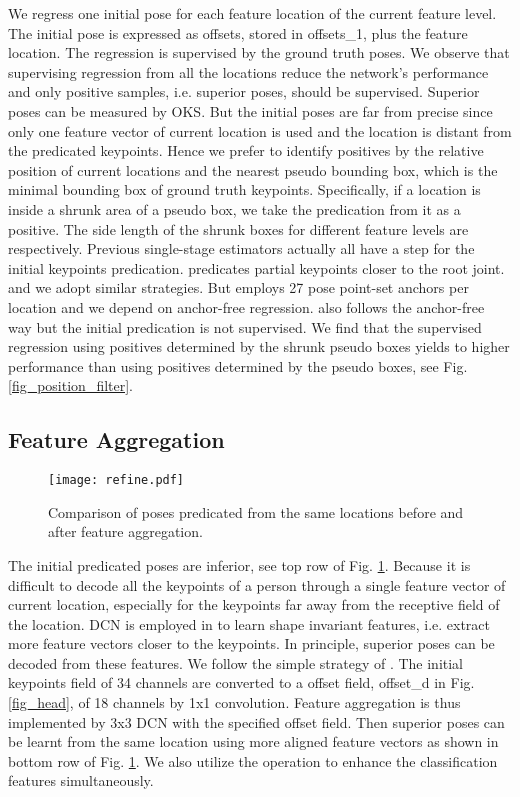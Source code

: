 \documentclass[11pt,twocolumn,journal]{IEEEtran}
\newcommand{\fig}{Fig. }
\begin{document}
We regress one initial pose for each feature location of the current feature level. The initial pose is expressed as  offsets, stored in offsets\_1, plus the feature location. 
The regression is supervised by the ground truth poses. We observe that supervising regression from all the locations reduce the network's performance and only positive samples, i.e. superior poses, should be supervised.  
Superior poses can be measured by OKS. But the initial poses are far from  precise since only one feature vector of current location is used and the location is distant from the predicated keypoints. Hence we prefer to 
identify positives by the relative position of current locations and the nearest pseudo bounding box, which is the minimal bounding box of ground truth keypoints. Specifically, if a location is inside a shrunk area of a pseudo box, we take the predication from it as a positive. The side length of the shrunk boxes for different feature levels are  respectively. 
Previous single-stage estimators \cite{spm19, directpose19, pointset20} actually all have a step for the initial keypoints predication. \cite{spm19} predicates partial keypoints closer to the root joint. \cite{directpose19, pointset20} and we adopt similar strategies. But \cite{pointset20} employs 27 pose point-set anchors per location and we depend on anchor-free regression. \cite{directpose19} also follows the anchor-free way but the initial predication is not supervised. We find that the supervised regression using positives determined by the shrunk pseudo boxes yields to higher performance than using positives determined by the pseudo boxes, see \fig\ref{fig_position_filter}.  


\subsection{Feature Aggregation}
\begin{figure}[t]
    \centering
\texttt{[image: refine.pdf]}
    \caption{Comparison of poses predicated from the same locations before and after feature aggregation.}
    \label{fig_feature_alignment}
\end{figure}
The initial predicated poses are inferior, see top row of \fig\ref{fig_feature_alignment}. Because it is difficult to decode all the keypoints of a person through a single feature vector of current location, especially for the keypoints far away from the receptive field of the location. DCN is employed in \cite{reppoints19, directpose19, pointset20} to learn shape invariant features, i.e. extract more feature vectors closer to the keypoints. 
In principle, superior poses can be decoded from these features. 
We follow the simple strategy of \cite{reppoints19, pointset20}. The initial keypoints field of 34 channels are converted to a offset field, offset\_d in \fig\ref{fig_head}, of 18 channels by 1x1 convolution. Feature aggregation is thus implemented by 3x3 DCN with the specified offset field. Then superior poses can be learnt from the same location using more aligned feature vectors as shown in bottom row of \fig\ref{fig_feature_alignment}. We also utilize the operation to enhance the classification features simultaneously. 
\end{document}
